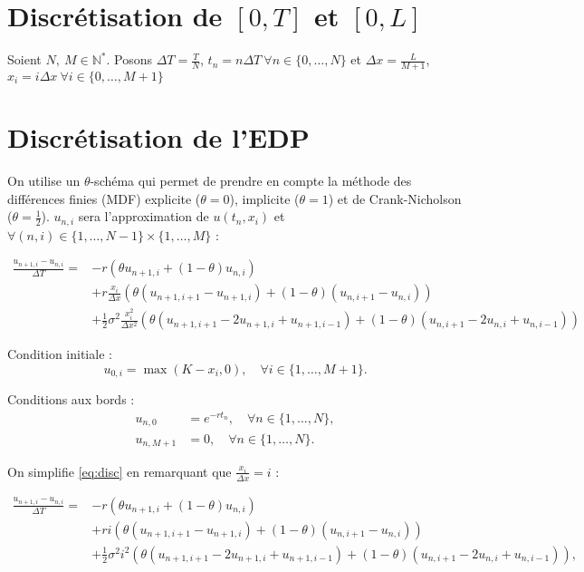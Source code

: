 \documentclass[a4paper, 11pt]{article}
\renewcommand{\(}{\left (}
\renewcommand{\)}{\right )}
\newcommand{\N}{\ensuremath{\mathbb{N}}}
\newcommand{\uni}[2]{u_{{#1},{#2}}}
\begin{document}
\section{Discr\'etisation de $[0,T]$ et $[0, L]$}

Soient $N,\ M\in\N^*$. Posons $\Delta T=\frac{T}{N}$, $t_n =
n\Delta T\ \forall n\in\{0,\ldots,N\}$ et $\Delta x=\frac{L}{M+1}$, $x_i =
i\Delta x\ \forall i\in\{0,\ldots,M+1\}$

\section{Discr\'etisation de l'EDP}

On utilise un $\theta$-sch\'ema qui permet de prendre en compte la
m\'ethode des diff\'erences finies (MDF) explicite ($\theta = 0$),
implicite ($\theta = 1$) et de Crank-Nicholson ($\theta =
\frac{1}{2}$). $u_{n,i}$ sera l'approximation de $u\(t_n,x_i\)$ et
$\forall (n,i)\in\{1,\ldots,N - 1\}\times\{1,\ldots,M\}$ :

\begin{align}
  \nonumber
  \frac{\uni{n + 1}{i} - \uni{n}{i}}{\Delta T} =
  & -r\(\theta\uni{n + 1}{i} + (1 - \theta)\uni{n}{i}\) \\
  \nonumber
  & +r\frac{x_i}{\Delta x}\(\theta\(\uni{n + 1}{i + 1} - \uni{n +
    1}{i}\) + (1 - \theta)\(\uni{n}{i + 1} - \uni{n}{i}\)\) \\
  \label{eq:disc}
  & +\frac{1}{2}\sigma^2\frac{x_i^2}{\Delta x^2}\(\theta\(\uni{n +
    1}{i + 1} - 2\uni{n + 1}{i} + \uni{n + 1}{i - 1}\) + (1 - \theta)\(\uni{n}{i + 1} - 2\uni{n}{i} + \uni{n}{i - 1}\)\)
\end{align}

Condition initiale :
$$\uni{0}{i} = \max(K - x_i, 0),\quad \forall i\in\{1,\ldots,M + 1\}.$$

Conditions aux bords :
\begin{align*}
  \uni{n}{0}     & = e^{-rt_n},\quad \forall n\in\{1,\ldots,N\}, \\
  \uni{n}{M + 1} & = 0,\quad \forall n\in\{1,\ldots,N\}.
\end{align*}

On simplifie \eqref{eq:disc} en remarquant que $\frac{x_i}{\Delta x} =
i$ :

\begin{align}
  \nonumber
  \frac{\uni{n + 1}{i} - \uni{n}{i}}{\Delta T} =
  & -r\(\theta\uni{n + 1}{i} + (1 - \theta)\uni{n}{i}\) \\
  \nonumber
  & +ri\(\theta\(\uni{n + 1}{i + 1} - \uni{n +
    1}{i}\) + (1 - \theta)\(\uni{n}{i + 1} - \uni{n}{i}\)\) \\
  \label{eq:disc}
  & +\frac{1}{2}\sigma^2i^2\(\theta\(\uni{n +
    1}{i + 1} - 2\uni{n + 1}{i} + \uni{n + 1}{i - 1}\) + (1 - \theta)\(\uni{n}{i + 1} - 2\uni{n}{i} + \uni{n}{i - 1}\)\),
\end{align}
\end{document}
